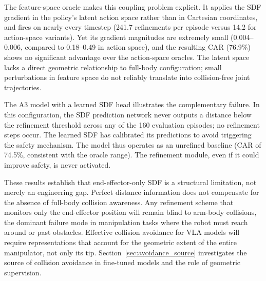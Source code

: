 The feature-space oracle makes this coupling problem explicit. It applies the SDF gradient in the policy's latent action space rather than in Cartesian coordinates, and fires on nearly every timestep (241.7 refinements per episode versus 14.2 for action-space variants). Yet its gradient magnitudes are extremely small (0.004--0.006, compared to 0.18--0.49 in action space), and the resulting CAR (76.9\%) shows no significant advantage over the action-space oracles. The latent space lacks a direct geometric relationship to full-body configuration; small perturbations in feature space do not reliably translate into collision-free joint trajectories.

The A3 model with a learned SDF head illustrates the complementary failure. In this configuration, the SDF prediction network never outputs a distance below the refinement threshold across any of the 160 evaluation episodes; no refinement steps occur. The learned SDF has calibrated its predictions to avoid triggering the safety mechanism. The model thus operates as an unrefined baseline (CAR of 74.5\%, consistent with the oracle range). The refinement module, even if it could improve safety, is never activated.

These results establish that end-effector-only SDF is a structural limitation, not merely an engineering gap. Perfect distance information does not compensate for the absence of full-body collision awareness. Any refinement scheme that monitors only the end-effector position will remain blind to arm-body collisions, the dominant failure mode in manipulation tasks where the robot must reach around or past obstacles. Effective collision avoidance for VLA models will require representations that account for the geometric extent of the entire manipulator, not only its tip. Section~\ref{sec:avoidance_source} investigates the source of collision avoidance in fine-tuned models and the role of geometric supervision.
